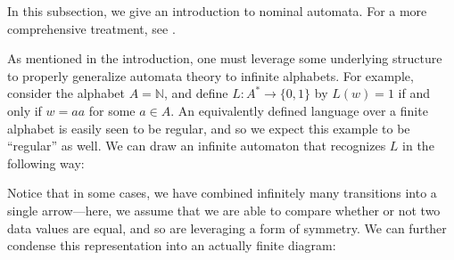 \documentclass[11pt,a4paper]{amsart}
\theoremstyle{definition}
\newcommand{\bb}{\mathbb}
\begin{document}
In this subsection, we give an introduction to nominal automata.
For a more comprehensive treatment, see \cite{bojanczyk-klin-lasota:automata-theory-in-nominal-sets}.

As mentioned in the introduction, one must leverage some underlying structure to properly generalize automata theory to infinite alphabets.
For example, consider the alphabet $A = \bb N$, and define $L : A^* \to \{0,1\}$ by $L(w) = 1$ if and only if $w = aa$ for some $a \in A$.
An equivalently defined language over a finite alphabet is easily seen to be regular, and so we expect this example to be ``regular'' as well. We can draw an infinite automaton that recognizes $L$ in the following way:

\begin{center}
\end{center}

Notice that in some cases, we have combined infinitely many transitions into a single arrow---here, we assume that we are able to compare whether or not two data values are equal, and so are leveraging a form of symmetry.
We can further condense this representation into an actually finite diagram:

\begin{center}
\end{center}
\end{document}
